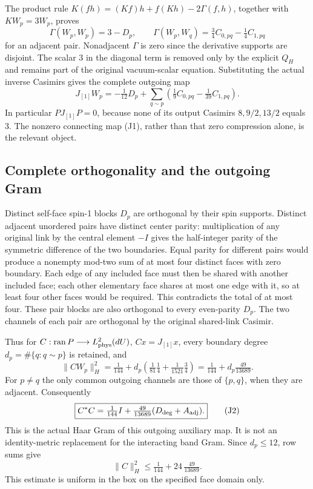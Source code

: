 \documentclass[11pt]{article}
\begin{document}
The product rule \(K(fh)=(Kf)h+f(Kh)-2\Gamma(f,h)\), together with \(KW_p=3W_p\), proves
\[
 \Gamma(W_p,W_p)=3-D_p,\qquad
 \Gamma(W_p,W_q)=\tfrac34C_{0,pq}-\tfrac14C_{1,pq}
\]
for an adjacent pair. Nonadjacent \(\Gamma\) is zero since the derivative supports are disjoint. The scalar 3 in the diagonal term is removed only by the explicit \(Q_H\) and remains part of the original vacuum-scalar equation. Substituting the actual inverse Casimirs gives the complete outgoing map
\[
 \boxed{
 J_{[1]}W_p=-\tfrac1{12}D_p+
 \sum_{q\sim p}\left(\tfrac19C_{0,pq}-\tfrac1{39}C_{1,pq}\right).
 }\tag{J1}
\]
In particular \(PJ_{[1]}P=0\), because none of its output Casimirs \(8,9/2,13/2\) equals 3. The nonzero connecting map (J1), rather than that zero compression alone, is the relevant object.

\subsection*{Complete orthogonality and the outgoing Gram}

Distinct self-face spin-1 blocks \(D_p\) are orthogonal by their spin supports. Distinct adjacent unordered pairs have distinct center parity: multiplication of any original link by the central element \(-I\) gives the half-integer parity of the symmetric difference of the two boundaries. Equal parity for different pairs would produce a nonempty mod-two sum of at most four distinct faces with zero boundary. Each edge of any included face must then be shared with another included face; each other elementary face shares at most one edge with it, so at least four other faces would be required. This contradicts the total of at most four. These pair blocks are also orthogonal to every even-parity \(D_p\). The two channels of each pair are orthogonal by the original shared-link Casimir.

Thus for \(C:\operatorname{ran}P\longrightarrow L^2_{\rm phys}(dU)\), \(Cx=J_{[1]}x\), every boundary degree \(d_p=\#\{q:q\sim p\}\) is retained, and
\[
 \|CW_p\|_H^2=\tfrac1{144}
 +d_p\left(\tfrac1{81}\tfrac14+\tfrac1{1521}\tfrac34\right)
 =\tfrac1{144}+d_p\tfrac{49}{13689}.
\]
For \(p\ne q\) the only common outgoing channels are those of \(\{p,q\}\), when they are adjacent. Consequently
\[
 \boxed{C^*C=\tfrac1{144}I+
 \tfrac{49}{13689}(D_{\deg}+A_{\rm adj}).}\tag{J2}
\]
This is the actual Haar Gram of this outgoing auxiliary map. It is not an identity-metric replacement for the interacting band Gram. Since \(d_p\le12\), row sums give
\[
 \|C\|_H^2\le\tfrac1{144}+24\,\tfrac{49}{13689}.
\]
This estimate is uniform in the box on the specified face domain only.
\end{document}
